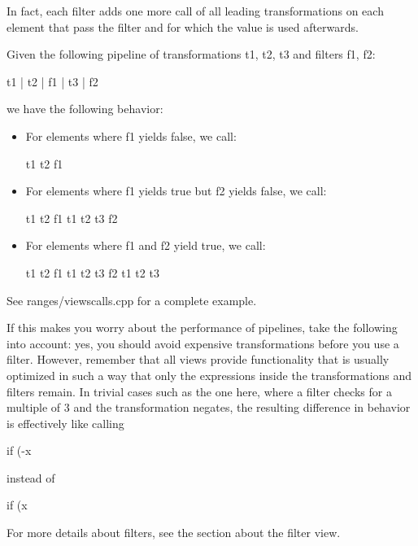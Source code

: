 In fact, each filter adds one more call of all leading transformations on each element that pass the filter and for which the value is used afterwards.

Given the following pipeline of transformations t1, t2, t3 and filters f1, f2:

\begin{cpp}
t1 | t2 | f1 | t3 | f2
\end{cpp}

we have the following behavior:

\begin{itemize}
\item
For elements where f1 yields false, we call:

\begin{cpp}
t1 t2 f1
\end{cpp}

\item
For elements where f1 yields true but f2 yields false, we call:

\begin{cpp}
t1 t2 f1 t1 t2 t3 f2
\end{cpp}

\item
For elements where f1 and f2 yield true, we call:

\begin{cpp}
t1 t2 f1 t1 t2 t3 f2 t1 t2 t3
\end{cpp}
\end{itemize}

See ranges/viewscalls.cpp for a complete example.

If this makes you worry about the performance of pipelines, take the following into account: yes, you should avoid expensive transformations before you use a filter. However, remember that all views provide functionality that is usually optimized in such a way that only the expressions inside the transformations and filters remain. In trivial cases such as the one here, where a filter checks for a multiple of 3 and the transformation negates, the resulting difference in behavior is effectively like calling

\begin{cpp}
if (-x %
\end{cpp}

instead of

\begin{cpp}
if (x %
\end{cpp}

For more details about filters, see the section about the filter view.
